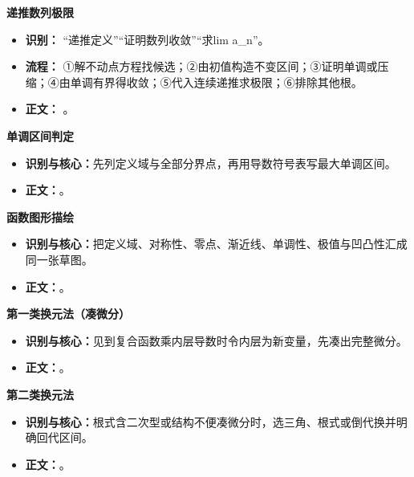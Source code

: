 \begin{knowledgeBox}
\textbf{递推数列极限}

\begin{itemize}
  \item \textbf{识别：} “递推定义”“证明数列收敛”“求lim a\_n”。
  \item \textbf{流程：} ①解不动点方程找候选；②由初值构造不变区间；③证明单调或压缩；④由单调有界得收敛；⑤代入连续递推求极限；⑥排除其他根。
  \item \textbf{正文：} 。
\end{itemize}
\end{knowledgeBox}

\begin{knowledgeBox}
\textbf{单调区间判定}

\begin{itemize}
  \item \textbf{识别与核心：}先列定义域与全部分界点，再用导数符号表写最大单调区间。
  \item \textbf{正文：}。
\end{itemize}

\textbf{函数图形描绘}

\begin{itemize}
  \item \textbf{识别与核心：}把定义域、对称性、零点、渐近线、单调性、极值与凹凸性汇成同一张草图。
  \item \textbf{正文：}。
\end{itemize}

\textbf{第一类换元法（凑微分）}

\begin{itemize}
  \item \textbf{识别与核心：}见到复合函数乘内层导数时令内层为新变量，先凑出完整微分。
  \item \textbf{正文：}。
\end{itemize}

\textbf{第二类换元法}

\begin{itemize}
  \item \textbf{识别与核心：}根式含二次型或结构不便凑微分时，选三角、根式或倒代换并明确回代区间。
  \item \textbf{正文：}。
\end{itemize}


\end{knowledgeBox}
